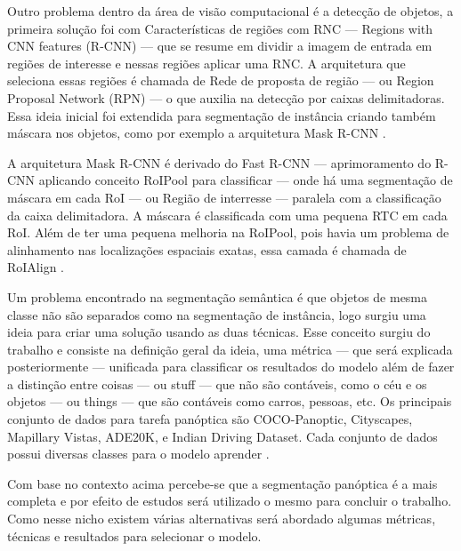 
Outro problema dentro da área de visão computacional é a detecção de objetos, a primeira solução foi com Características de regiões com RNC — Regions with CNN features (R-CNN) — que se resume em dividir a imagem de entrada em regiões de interesse e nessas regiões aplicar uma RNC. A arquitetura que seleciona essas regiões é chamada de Rede de proposta de região — ou Region Proposal Network (RPN) — o que auxilia na detecção por caixas delimitadoras. Essa ideia inicial foi extendida para segmentação de instância criando também máscara nos objetos, como por exemplo a arquitetura Mask R-CNN \space\cite{dp_semantic_segmantation, lapix}.

A arquitetura Mask R-CNN é derivado do Fast R-CNN — aprimoramento do R-CNN aplicando conceito RoIPool para classificar — onde há uma segmentação de máscara em cada RoI — ou Região de interresse — paralela com a classificação da caixa delimitadora. A máscara é classificada com uma pequena RTC em cada RoI. Além de ter uma pequena melhoria na RoIPool, pois havia um problema de alinhamento nas localizações espaciais exatas, essa camada é chamada de RoIAlign \space\cite{maskRCNN}.


Um problema encontrado na segmentação semântica é que objetos de mesma classe não são separados como na segmentação de instância, logo surgiu uma ideia para criar uma solução usando as duas técnicas. Esse conceito surgiu do trabalho \space{} e consiste na definição geral da ideia, uma métrica — que será explicada posteriormente — unificada para classificar os resultados do modelo além de fazer a distinção entre coisas — ou stuff — que não são contáveis, como o céu e os objetos — ou things — que são contáveis como carros, pessoas, etc. 
Os principais conjunto de dados para tarefa panóptica são COCO-Panoptic, Cityscapes, Mapillary Vistas, ADE20K, e Indian Driving Dataset. Cada conjunto de dados possui diversas classes para o modelo aprender \space\cite{v7labs2022panoptic}.


Com base no contexto acima percebe-se que a segmentação panóptica é a mais completa e por efeito de estudos será utilizado o mesmo para concluir o trabalho. Como nesse nicho existem várias alternativas será abordado algumas métricas, técnicas e resultados para selecionar o modelo.

